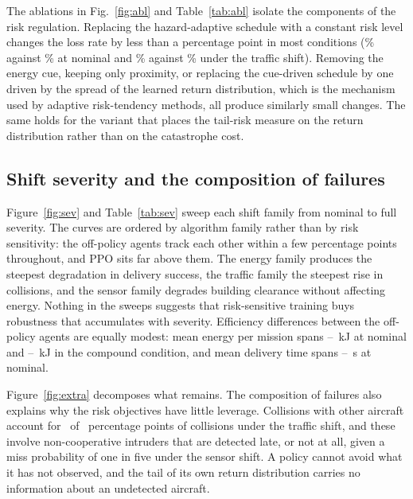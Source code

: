 The ablations in Fig.~\ref{fig:abl} and Table~\ref{tab:abl} isolate the components of the risk regulation. Replacing the hazard-adaptive schedule with a constant risk level changes the loss rate by less than a percentage point in most conditions (\AFixedalphaLossNominal\% against \RCrestcOnlineLossNominal\% at nominal and \AFixedalphaLossTraffic\% against \RCrestcOnlineLossTraffic\% under the traffic shift). Removing the energy cue, keeping only proximity, or replacing the cue-driven schedule by one driven by the spread of the learned return distribution, which is the mechanism used by adaptive risk-tendency methods, all produce similarly small changes. The same holds for the variant that places the tail-risk measure on the return distribution rather than on the catastrophe cost.

\subsection*{Shift severity and the composition of failures}

Figure~\ref{fig:sev} and Table~\ref{tab:sev} sweep each shift family from nominal to full severity. The curves are ordered by algorithm family rather than by risk sensitivity: the off-policy agents track each other within a few percentage points throughout, and PPO sits far above them. The energy family produces the steepest degradation in delivery success, the traffic family the steepest rise in collisions, and the sensor family degrades building clearance without affecting energy. Nothing in the sweeps suggests that risk-sensitive training buys robustness that accumulates with severity. Efficiency differences between the off-policy agents are equally modest: mean energy per mission spans \RDsacnStdEnergyNominal--\RSacStdEnergyNominal~kJ at nominal and \RDsacnStdEnergyCompound--\RSacStdEnergyCompound~kJ in the compound condition, and mean delivery time spans \RDsacnStdTdelNominal--\RSacStdTdelNominal~s at nominal.

Figure~\ref{fig:extra} decomposes what remains. The composition of failures also explains why the risk objectives have little leverage. Collisions with other aircraft account for \RSacStdCollaTraffic\ of \RSacStdCollTraffic\ percentage points of collisions under the traffic shift, and these involve non-cooperative intruders that are detected late, or not at all, given a miss probability of one in five under the sensor shift. A policy cannot avoid what it has not observed, and the tail of its own return distribution carries no information about an undetected aircraft.

